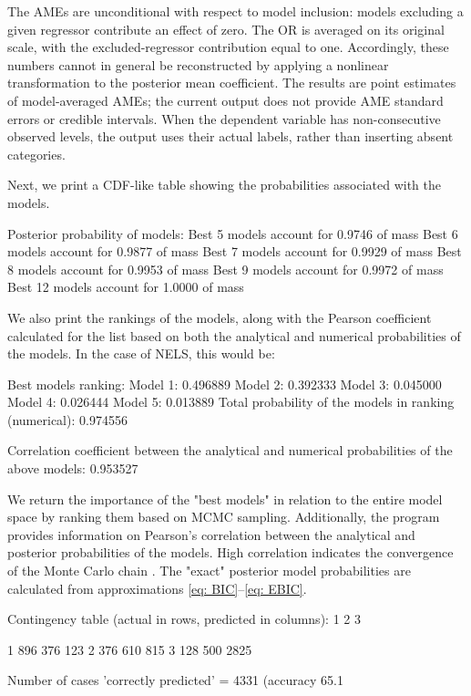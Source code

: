 The AMEs are unconditional with respect to model inclusion:
models excluding a given regressor contribute an effect of
zero. The OR is averaged on its original scale, with the
excluded-regressor contribution equal to one. Accordingly,
these numbers cannot in general be reconstructed by applying
a nonlinear transformation to the posterior mean coefficient.
The results are point estimates of model-averaged AMEs; the
current output does not provide AME standard errors or
credible intervals. When the dependent variable has
non-consecutive observed levels, the output uses their actual
labels, rather than inserting absent categories.

Next, we print a CDF-like table showing the
probabilities associated with the models.
\begin{CodeChunk}\begin{CodeOutput}
Posterior probability of models:
Best 5   models account for 0.9746 of mass
Best 6   models account for 0.9877 of mass
Best 7   models account for 0.9929 of mass
Best 8   models account for 0.9953 of mass
Best 9   models account for 0.9972 of mass
Best 12  models account for 1.0000 of mass
\end{CodeOutput}
\end{CodeChunk}

We also print the rankings of the models, along with\label{top_ranked_models}
the Pearson coefficient calculated for the list based
on both the analytical and numerical probabilities of
the models. In the case of NELS, this would be:
\begin{CodeChunk}\begin{CodeOutput}
Best models ranking:
Model 1:	0.496889
Model 2:	0.392333
Model 3:	0.045000
Model 4:	0.026444
Model 5:	0.013889
Total probability of the models in ranking (numerical): 0.974556

Correlation coefficient between the analytical
and numerical probabilities of the above models: 0.953527
\end{CodeOutput}
\end{CodeChunk}

We return the importance of the "best models" in relation
to the entire model space by ranking them based on MCMC
sampling. Additionally, the program provides information
on Pearson's correlation between the analytical and \MCcube
posterior probabilities of the models. High correlation
indicates the convergence of the Monte Carlo chain
\citep{koop2003,fernandezleysteel2001b}. The "exact"
posterior model probabilities are calculated from
approximations \ref{eq: BIC}--\ref{eq: EBIC}.
\\
\begin{CodeChunk}\begin{CodeOutput}
Contingency table (actual in rows, predicted in columns):
             1         2         3

1          896       376       123
2          376       610       815
3          128       500      2825

Number of cases 'correctly predicted' = 4331 (accuracy 65.1%
\end{CodeOutput}
\end{CodeChunk}

